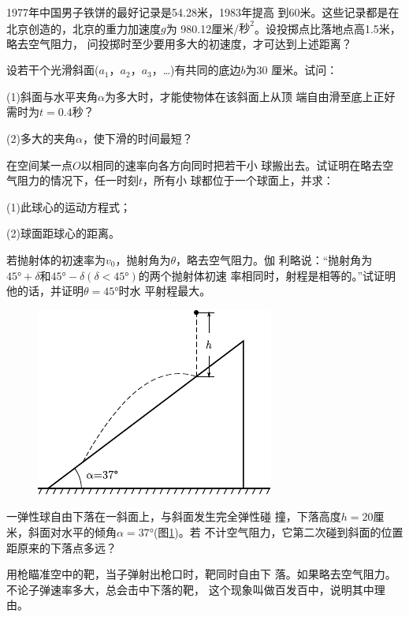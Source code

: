 \begin{exercises}
\exercise 1977年中国男子铁饼的最好记录是54.28米，1983年提高
到60米。这些记录都是在北京创造的，北京的重力加速度$g$为
980.12厘米/$\text{秒}^2$。设投掷点比落地点高1.5米，略去空气阻力，
问投掷时至少要用多大的初速度，才可达到上述距离？

\exercise 设若干个光滑斜面($a_1$，$a_2$，$a_3$，…)有共同的底边$b$为30
厘米。试问：

(1)斜面与水平夹角$\alpha$为多大时，才能使物体在该斜面上从顶
端自由滑至底上正好需时为$t=0.4$秒？

(2)多大的夹角$\alpha$，使下滑的时间最短？

\exercise 在空间某一点$O$以相同的速率向各方向同时把若干小
球搬出去。试证明在略去空气阻力的情况下，任一时刻$t$，所有小
球都位于一个球面上，并求：

(1)此球心的运动方程式；

(2)球面距球心的距离。

\exercise 若抛射体的初速率为$v_0$，抛射角为$\theta$，略去空气阻力。伽
利略说：“抛射角为$\ang{45;;}+\delta$和$\ang{45;;}-\delta(\delta<\ang{45;;})$的两个抛射体初速
率相同时，射程是相等的。”试证明他的话，并证明$\theta=\ang{45;;}$时水
平射程最大。

\begin{figure}
    \vspace{-2.5em}
    \begin{center}
        \includegraphics{figure/fig01.31}
        \caption{}
        \label{fig:01.31}
    \end{center}
\end{figure}
\exercise 一弹性球自由下落在一斜面上，与斜面发生完全弹性碰
撞，下落高度$h=20$厘米，斜面对水平的倾角$\alpha=\ang{37;;}$(图\ref{fig:01.31})。若
不计空气阻力，它第二次碰到斜面的位置距原来的下落点多远？

\exercise 用枪瞄准空中的靶，当子弹射出枪口时，靶同时自由下
落。如果略去空气阻力。不论子弹速率多大，总会击中下落的靶，
这个现象叫做百发百中，说明其中理由。


\end{exercises}
